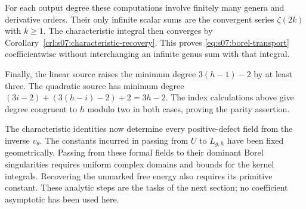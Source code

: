 \begin{prf}
For each output degree these computations involve finitely many
genera and derivative orders. Their only infinite scalar sums are
the convergent series $\zeta(2k)$ with $k\geq1$. The characteristic
integral then converges by Corollary~\ref{crl:s07:characteristic-recovery}.
This proves \eqref{eq:s07:borel-transport} coefficientwise without
interchanging an infinite genus sum with that integral.

Finally, the linear source raises the minimum degree
$3(h-1)-2$ by at least three. The quadratic source has minimum
degree $(3i-2)+(3(h-i)-2)+2=3h-2$.
The index calculations above give degree congruent to $h$ modulo
two in both cases, proving the parity assertion.
\end{prf}

The characteristic identities now determine every positive-defect
field from the inverse $v_\theta$. The constants incurred in passing
from $U$ to $L_{g,h}$ have been fixed geometrically. Passing from
these formal fields to their dominant Borel
singularities requires uniform complex domains and bounds for the
kernel integrals. Recovering the unmarked free energy also requires
its primitive constant. These analytic steps are the tasks of the
next section; no coefficient asymptotic has been used here.
